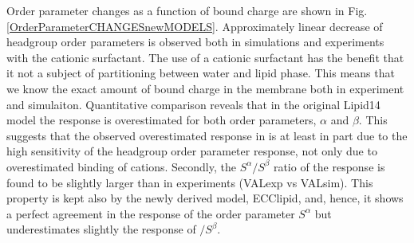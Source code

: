 \documentclass[aip,jcp,twocolumn]{revtex4}
\begin{document}
Order parameter changes as a function of bound charge are shown in
Fig. \ref{OrderParameterCHANGESnewMODELS}. 
Approximately linear decrease of headgroup order parameters is observed both in simulations and experiments with the cationic surfactant. 
The use of a cationic surfactant has the benefit that it not a subject of partitioning between water and lipid phase. 
This means that we know the exact amount of bound charge in the membrane both in experiment and simulaiton. 
Quantitative comparison reveals that in the original Lipid14 model the response is overestimated for both order parameters, $\alpha$ and $\beta$. 
This suggests that the observed overestimated response in \cite{catte16} 
is at least in part due to the high sensitivity of the headgroup order parameter response, 
not only due to overestimated binding of cations. 
Secondly, the $S^\alpha/S^\beta$ ratio of the response is found to be slightly larger than in experiments (VALexp vs VALsim).
This property is kept also by the newly derived model, ECClipid, and, hence, 
it shows a perfect agreement in the response of the order parameter $S^\alpha$ 
but underestimates slightly the response of $/S^\beta$. 


\end{document}
